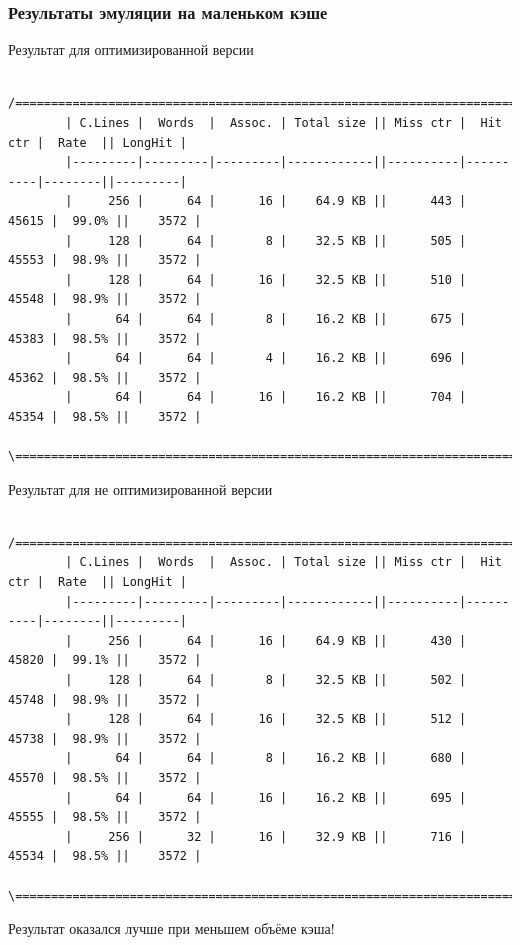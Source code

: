 \documentclass{beamer}
\begin{document}

\begin{frame}[fragile] %
\frametitle{Результаты эмуляции на маленьком кэше}

\begin{block}{Результат для оптимизированной версии}
\begin{verbatim}
        /=====================================================================================\
        | C.Lines |  Words  |  Assoc. | Total size || Miss ctr |  Hit ctr |  Rate  || LongHit |
        |---------|---------|---------|------------||----------|----------|--------||---------|
        |     256 |      64 |      16 |    64.9 KB ||      443 |    45615 |  99.0% ||    3572 |
        |     128 |      64 |       8 |    32.5 KB ||      505 |    45553 |  98.9% ||    3572 |
        |     128 |      64 |      16 |    32.5 KB ||      510 |    45548 |  98.9% ||    3572 |
        |      64 |      64 |       8 |    16.2 KB ||      675 |    45383 |  98.5% ||    3572 |
        |      64 |      64 |       4 |    16.2 KB ||      696 |    45362 |  98.5% ||    3572 |
        |      64 |      64 |      16 |    16.2 KB ||      704 |    45354 |  98.5% ||    3572 |
        \=====================================================================================/
\end{verbatim}
\end{block}

\begin{block}{Результат для не оптимизированной версии}
\begin{verbatim}
        /=====================================================================================\
        | C.Lines |  Words  |  Assoc. | Total size || Miss ctr |  Hit ctr |  Rate  || LongHit |
        |---------|---------|---------|------------||----------|----------|--------||---------|
        |     256 |      64 |      16 |    64.9 KB ||      430 |    45820 |  99.1% ||    3572 |
        |     128 |      64 |       8 |    32.5 KB ||      502 |    45748 |  98.9% ||    3572 |
        |     128 |      64 |      16 |    32.5 KB ||      512 |    45738 |  98.9% ||    3572 |
        |      64 |      64 |       8 |    16.2 KB ||      680 |    45570 |  98.5% ||    3572 |
        |      64 |      64 |      16 |    16.2 KB ||      695 |    45555 |  98.5% ||    3572 |
        |     256 |      32 |      16 |    32.9 KB ||      716 |    45534 |  98.5% ||    3572 |
        \=====================================================================================/
\end{verbatim}
\end{block}

Результат оказался лучше при меньшем объёме кэша!

\end{frame}
\end{document}
